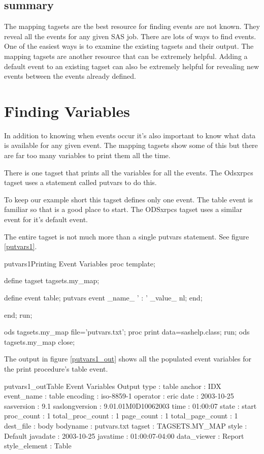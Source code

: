 \subsection{summary}
The mapping tagsets are the best resource for 
finding events are not known.  They reveal 
all the events for any given SAS job.  
There are lots of ways to find events. 
One of the easiest ways is to examine the existing
 tagsets and their output.
The mapping tagsets are another resource that can
be extremely helpful.  Adding a default event
to an existing tagset can also be extremely helpful
for revealing new events between the events already
defined.

\section{Finding Variables}
In addition to knowing when events occur it's also
important to know what data is available for any 
given event.  The mapping tagsets show some of this
but there are far too many variables to print them
all the time.

There is one tagset that prints all the variables
for all the events.  The Odsxrpcs tagset uses a
statement called putvars to do this.

To keep our example short this tagset defines only one event.
The table event is familiar so that is a good place to start.
The ODSxrpcs tagset uses a similar event for it's default event.

The entire tagset is not much more than a single putvars statement. 
See figure \ref{putvars1}.

\begin{fvcode}{putvars1}{Printing Event Variables}
proc template;

    define tagset tagsets.my_map;

        define event table;
            putvars event _name_ ' : ' _value_ nl;
        end;

     end;
run;

ods tagsets.my_map file='putvars.txt';
proc print data=sashelp.class; run;
ods tagsets.my_map close;
\end{fvcode}

The output in figure \ref{putvars1_out} shows all the populated 
event variables for the print procedure's table event.  

\begin{poutput}{putvars1_out}{Table Event Variables Output}
type : table
anchor : IDX
event_name : table
encoding : iso-8859-1
operator : eric
date : 2003-10-25
sasversion : 9.1
saslongversion : 9.01.01M0D10062003
time : 01:00:07
state : start
proc_count : 1
total_proc_count : 1
page_count : 1
total_page_count : 1
dest_file : body
bodyname : putvars.txt
tagset : TAGSETS.MY_MAP
style : Default
javadate : 2003-10-25
javatime : 01:00:07-04:00
data_viewer : Report
style_element : Table
\end{poutput}

